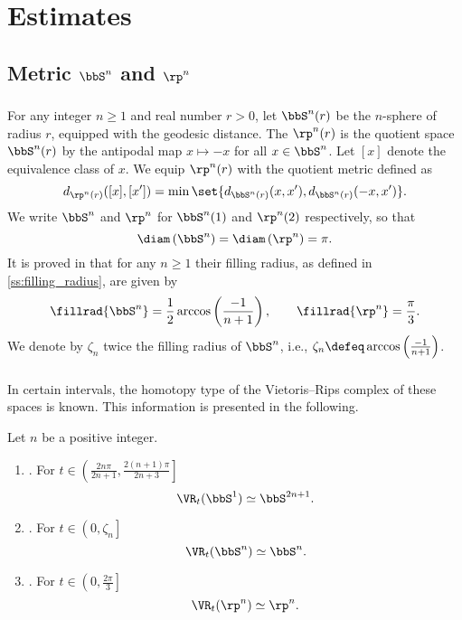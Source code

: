 
\section{Estimates}\label{s:computations}

\subsection{Metric $\bbS^n$ and $\rp^n$}

\subsubsection{} For any integer $n \geq 1$ and real number $r > 0$, let $\bbS^n(r)$ be the $n$-sphere of radius $r$, equipped with the geodesic distance.
The  $\rp^n(r)$ is the quotient space $\bbS^n(r)$ by the antipodal map $x \mapsto -x$ for all $x \in \bbS^n$.
Let $[x]$ denote the equivalence class of $x$.
We equip $\rp^n(r)$ with the quotient metric defined as
\[
d_{\rp^n(r)}([x],[x']) =
\min \set{d_{\bbS^n(r)}(x, x'), d_{\bbS^n(r)}(-x, x')}.
\]
We write $\bbS^n$ and $\rp^n$ for $\bbS^n(1)$ and $\rp^n(2)$ respectively, so that
\[
\diam \left(\bbS^n \right) = \diam\left(\rp^n \right) = \pi.
\]
It is proved in \cite{katz1983filling} that for any $n \geq 1$ their filling radius, as defined in \cref{ss:filling_radius}, are given by
\[
\fillrad{\bbS^n} = \frac{1}{2}\arccos\left(\frac{-1}{n+1}\right), \qquad
\fillrad{\rp^n} = \frac{\pi}{3}.
\]
We denote by $\zeta_n$ twice the filling radius of $\bbS^n$, i.e., $\zeta_n \defeq \arccos\left(\frac{-1}{n+1}\right)$.

\subsubsection{} In certain intervals, the homotopy type of the Vietoris--Rips complex of these spaces is known.
This information is presented in the following.

\medskip\proposition Let $n$ be a positive integer.
\begin{enumerate}[{\rm (a)}]
	\item\label{prop:S1}{\rm \cite[Thm.~7.4]{adamaszek2017vietoris}.}
	For $t \in \left(\frac{2n\pi}{2n+1}, \frac{2(n+1)\pi}{2n+3}\right]$
	\[
	\VR_t(\bbS^1) \simeq \bbS^{2n+1}.
	\]
	
	\item\label{prop:Sn}{\rm \cite[Thm.~10]{lim2020vietoris}.}
	For $t \in \left(0, \zeta_n\right]$
	\[
	\VR_t(\bbS^n) \simeq \bbS^n.
	\]
	
	\item\label{prop:RPn}{\rm \cite[Thm.~4.5]{adams2022metric}.}
	For $t \in \left(0,\frac{2\pi}{3} \right]$
	\[
	\VR_t(\rp^n) \simeq \rp^n.
	\]
\end{enumerate}

